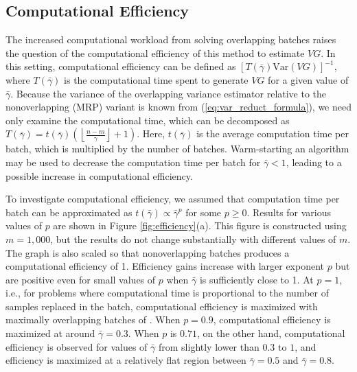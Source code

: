 \documentclass[12pt]{article}
\newcommand{\var}[1]{\mathrm{Var} \left( #1 \right)}
\newcommand{\nb}{\left\lfloor\tfrac{n-m}{\gamma}\right\rfloor+1}
\newcommand{\gammab}{\bar{\gamma}}
\begin{document}
\subsection{Computational Efficiency}
\label{ssec:compeff}


The increased computational workload from solving overlapping batches raises the question of the computational efficiency of this method to estimate $VG$.
In this setting, computational efficiency can be defined as $[T(\gammab)\var{VG}]^{-1}$, where $T(\gammab)$ is the computational time spent to generate $VG$ for a given value of $\gammab$.
Because the variance of the overlapping variance estimator relative to the nonoverlapping (MRP) variant is known from (\ref{eq:var_reduct_formula}), we need only examine the computational time, which can be decomposed as $T(\gammab) = t(\gammab)\left(\nb\right)$. 
Here, $t(\gammab)$ is the average computation time per batch, which is multiplied by the number of batches.
Warm-starting an algorithm may be used to decrease the computation time per batch for $\gammab < 1$, leading to a possible increase in computational efficiency. 

To investigate computational efficiency, we assumed that computation time per batch can be approximated as $t(\gammab) \propto \gammab^p$ for some $p \geq 0$.
Results for various values of $p$ are shown in Figure \ref{fig:efficiency}(a). 
This figure is constructed using $m = 1,000$, but the results do not change substantially with different values of $m$.
The graph is also scaled so that nonoverlapping batches produces a computational efficiency of 1. 
Efficiency gains increase with larger exponent $p$ but are positive even for small values of $p$ when $\gammab$ is sufficiently close to 1.
At $p=1$, i.e., for problems where computational time is proportional to the number of samples replaced in the batch, computational efficiency is maximized with maximally overlapping batches of \cite{Meketon1984}.
When $p=0.9$, computational efficiency is maximized at around $\gammab=0.3$.
When $p$ is $0.71$, on the other hand, computational efficiency is observed for values of $\gammab$ from slightly lower than $0.3$ to $1$, and efficiency is maximized at a relatively flat region between $\gammab=0.5$ and $\gammab=0.8$.
\end{document}
